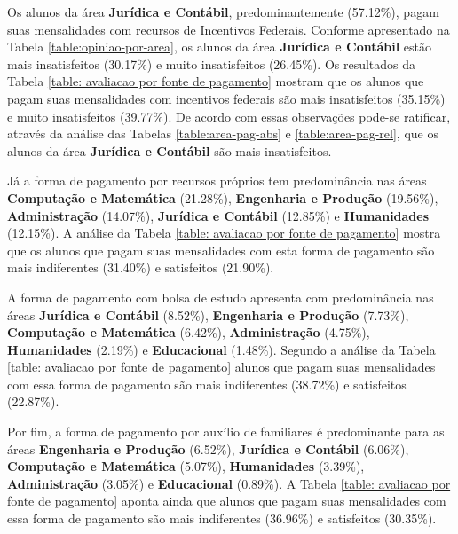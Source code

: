 \documentclass[10pt,a4paper,oneside]{article}
\begin{document}
Os alunos da área \textbf{Jurídica e Contábil}, predominantemente (57.12\%), pagam suas mensalidades com recursos de Incentivos Federais. Conforme apresentado na Tabela \ref{table:opiniao-por-area}, os alunos da área 
\textbf{Jurídica e Contábil} estão mais insatisfeitos (30.17\%) e muito insatisfeitos (26.45\%). Os resultados da Tabela \ref{table: avaliacao por fonte de pagamento} mostram que os alunos que pagam suas mensalidades com incentivos federais são 
mais insatisfeitos (35.15\%) e muito insatisfeitos (39.77\%). De acordo com essas observações pode-se ratificar, através da análise das Tabelas \ref{table:area-pag-abs} e \ref{table:area-pag-rel}, que 
os alunos da área \textbf{Jurídica e Contábil} são mais insatisfeitos.

Já a forma de pagamento por recursos próprios tem predominância nas áreas \textbf{Computação e Matemática} (21.28\%), \textbf{Engenharia e Produção} (19.56\%), \textbf{Administração} (14.07\%), 
\textbf{Jurídica e Contábil} (12.85\%) e \textbf{Humanidades} (12.15\%). A análise da Tabela \ref{table: avaliacao por fonte de pagamento} mostra que os alunos que pagam suas mensalidades com esta forma de pagamento são mais indiferentes 
(31.40\%) e satisfeitos (21.90\%). 

A forma de pagamento com bolsa de estudo apresenta com predominância nas áreas \textbf{Jurídica e Contábil} (8.52\%), \textbf{Engenharia e Produção} (7.73\%), \textbf{Computação e Matemática} 
(6.42\%), \textbf{Administração} (4.75\%), \textbf{Humanidades} (2.19\%) e \textbf{Educacional} (1.48\%). Segundo a análise da Tabela \ref{table: avaliacao por fonte de pagamento} alunos que pagam suas mensalidades com essa forma de pagamento 
são mais indiferentes (38.72\%) e satisfeitos (22.87\%).

Por fim, a forma de pagamento por auxílio de familiares é predominante para as áreas \textbf{Engenharia e Produção} (6.52\%), \textbf{Jurídica e Contábil} (6.06\%), \textbf{Computação e Matemática} 
(5.07\%), \textbf{Humanidades} (3.39\%), \textbf{Administração} (3.05\%) e \textbf{Educacional} (0.89\%). A Tabela \ref{table: avaliacao por fonte de pagamento} aponta ainda que alunos que pagam suas mensalidades com essa forma de pagamento são 
mais indiferentes (36.96\%) e satisfeitos (30.35\%).
\end{document}
